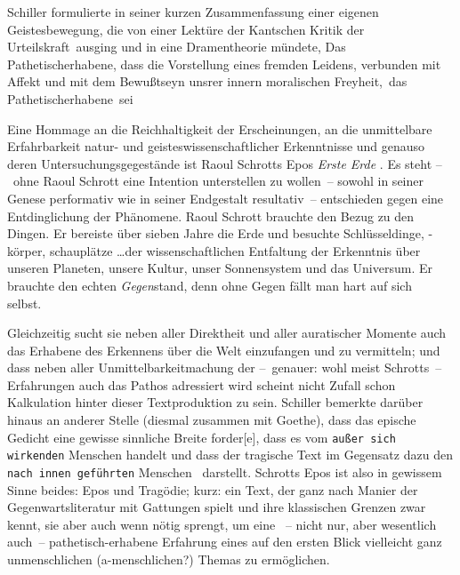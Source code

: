 Schiller formulierte in seiner kurzen Zusammenfassung einer eigenen
  Geistesbewegung, die von einer Lektüre der Kantschen \glqq Kritik der
  Urteilskraft\grqq\ ausging und in eine Dramentheorie mündete, \glqq Das
  Pathetischerhabene\grqq, dass die \glqq Vorstellung eines fremden Leidens,
  verbunden mit Affekt und mit dem Bewu\ss tseyn unsrer innern moralischen
  Freyheit,\grqq\ das \glqq Pathetischerhabene\grqq\ sei
  \citep[S. ? f.]{SchillerPathetischErhaben}

Eine Hommage an die Reichhaltigkeit der Erscheinungen, an die unmittelbare
  Erfahrbarkeit natur- und geisteswissenschaftlicher Erkenntnisse und genauso
  deren Untersuchungsgegestände ist Raoul Schrotts Epos \emph{Erste Erde}
  \citep{Schrott2016ErsteErde}.
Es steht --~ohne Raoul Schrott eine Intention unterstellen zu wollen~--
  sowohl in seiner Genese performativ wie in seiner Endgestalt resultativ~--
  entschieden gegen eine Entdinglichung der Phänomene. Raoul Schrott brauchte
  den Bezug zu den Dingen. Er bereiste über sieben Jahre die Erde und besuchte
  Schlüsseldinge, -körper, schauplätze \ldots der wissenschaftlichen
  Entfaltung der Erkenntnis über unseren Planeten, unsere Kultur, unser
  Sonnensystem und das Universum. Er brauchte den echten \emph{Gegen}stand,
   \glqq denn ohne Gegen fällt man hart auf sich selbst.\grqq\ \citep[S.
   60]{Han2016}

Gleichzeitig sucht sie neben aller Direktheit und aller auratischer Momente
  auch das Erhabene des Erkennens über die Welt einzufangen und zu vermitteln;
  und dass neben aller Unmittelbarkeitmachung der --~genauer: wohl meist
  Schrotts~-- Erfahrungen auch das Pathos adressiert wird scheint nicht Zufall
  schon Kalkulation hinter dieser Textproduktion zu sein.
Schiller bemerkte darüber hinaus an anderer Stelle (diesmal zusammen mit
  Goethe), dass das epische Gedicht \glqq eine gewisse sinnliche Breite
  forder[e]\grqq, dass es vom \glqq\texttt{au\ss er sich wirkenden} Menschen
  handelt und dass der tragische Text im Gegensatz dazu den \glqq\texttt{nach
  innen geführten} Menschen \grqq\ darstellt.
Schrotts Epos ist also in gewissem Sinne beides: Epos und Tragödie; kurz: ein
  Text, der ganz nach Manier der Gegenwartsliteratur mit Gattungen spielt und
  ihre klassischen Grenzen zwar kennt, sie aber auch wenn nötig sprengt, um
  eine ~-- nicht nur, aber wesentlich auch~-- pathetisch-erhabene Erfahrung
  eines auf den ersten Blick vielleicht ganz unmenschlichen (a-menschlichen?)
  Themas zu ermöglichen. 

